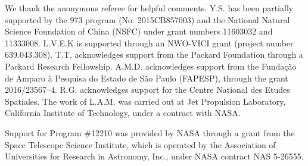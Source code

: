 \documentclass{emulateapj}
\begin{document}
\acknowledgments

We thank the anonymous referee for helpful comments. 
Y.S. has been partially supported by the 973 program (No. 2015CB857003) and 
the National Natural Science Foundation of China (NSFC) 
under grant numbers 11603032 and 11333008. 
L.V.E.K is supported through an NWO-VICI grant (project number 639.043.308). 
T.T. acknowledges support from the Packard Foundation through a Packard Research Fellowship. 
A.M.D. acknowledges support from the Funda\c{c}\~ao de Amparo \`a Pesquisa do 
Estado de S\~ao Paulo (FAPESP), through the grant 2016/23567--4. 
R.G. acknowledges support for the Centre National des Etudes Spatiales. The work of L.A.M. was carried out at Jet Propulsion Laboratory, California Institute of Technology, under a contract with NASA. 

Support for Program \#12210 was provided by NASA through a grant from the Space Telescope Science Institute, which is operated by the Association of Universities for Research in Astronomy, Inc., under NASA contract NAS 5-26555.
\end{document}
